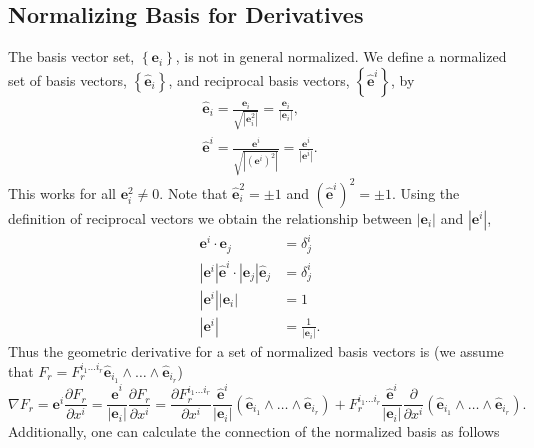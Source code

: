 \documentclass[12pt,twoside,openright]{memoir}
\newcommand{\bm}[1]{\boldsymbol{#1}}
\newcommand{\bfrac}[2]{\displaystyle\frac{#1}{#2}}
\newcommand{\lp}{\left (}
\newcommand{\rp}{\right )}
\newcommand{\abs}[1]{\left |{#1}\right |}
\newcommand{\pdiff}[2]{\bfrac{\partial {#1}}{\partial {#2}}}
\newcommand{\lbrc}{\left \{}
\newcommand{\rbrc}{\right \}}
\newcommand{\set}[1]{\lbrc {#1} \rbrc}
\newcommand{\W}{\wedge}
\newcommand{\paren}[1]{\lp {#1} \rp}
\newcommand{\be}{\begin{equation}}
\newcommand{\ee}{\end{equation}}
\newcommand{\eb}{\bm{e}}
\newcommand{\ehb}{\bm{\hat{e}}}
\begin{document}
\subsection{Normalizing Basis for Derivatives}

The basis vector set, $\set{\bm{e}_{i}}$, is not in general normalized.  We define a normalized set of basis
vectors, $\set{\bm{\hat{e}}_{i}}$, and reciprocal basis vectors, $\set{\bm{\hat{e}}^{i}}$, by
\begin{align}
  \bm{\hat{e}}_{i} = \bfrac{\bm{e}_{i}}{\sqrt{\abs{\bm{e}_{i}^{2}}}} = \bfrac{\bm{e}_{i}}{\abs{\bm{e}_{i}}}, \\
  \bm{\hat{e}}^{i} = \bfrac{\bm{e}^{i}}{\sqrt{\abs{\paren{\bm{e}^{i}}^{2}}}} = \bfrac{\bm{e}^{i}}{\abs{\bm{e}^{i}}}.
\end{align}
This works for all $\bm{e}_{i}^{2} \neq 0$.  Note that  $\bm{\hat{e}}_{i}^{2} = \pm 1$ and $\paren{\bm{\hat{e}}^{i}}^{2} = \pm 1$.  
Using the definition of reciprocal vectors we obtain the relationship between $\abs{\bm{e}_{i}}$ and $\abs{\bm{e}^{i}}$,
\begin{align*}
	\bm{e}^{i}\cdot \bm{e}_{j} &= \delta^{i}_{j} \nonumber \\
	\abs{\bm{e}^{i}}\bm{\hat{e}}^{i}\cdot \abs{\bm{e}_{j}}\bm{\hat{e}}_{j} &= \delta^{i}_{j} \nonumber \\
	\abs{\bm{e}^{i}}\abs{\bm{e}_{i}} &= 1 \nonumber \\
	\abs{\bm{e}^{i}} &= \bfrac{1}{\abs{\bm{e}_{i}}}.
\end{align*} 
Thus the geometric derivative for a set of normalized basis vectors is (we assume that 
$F_{r} = F_{r}^{i_{1}\dots i_{r}} \bm{\hat{e}}_{i_{1}}\W\dots\W\bm{\hat{e}}_{i_{r}}$)
\be
	\nabla F_{r} = \eb^{i}\pdiff{F_{r}}{x^{i}} = \bfrac{\ehb^{i}}{\abs{\eb_{i}}}\pdiff{F_{r}}{x^{i}}
	             =\pdiff{F_{r}^{i_{1}\dots i_{r}}}{x^{i}}\bfrac{\bm{\hat{e}}^{i}}{\abs{\bm{e}_{i}}}
	               \paren{\bm{\hat{e}}_{i_{1}}\W\dots\W\bm{\hat{e}}_{i_{r}}}
	                +F_{r}^{i_{1}\dots i_{r}}\bfrac{\bm{\hat{e}}^{i}}{\abs{\bm{e}_{i}}}\pdiff{}{x^{i}}
	                \paren{\bm{\hat{e}}_{i_{1}}\W\dots\W\bm{\hat{e}}_{i_{r}}}.
\ee
Additionally, one can calculate the connection of the normalized basis as follows
\end{document}
